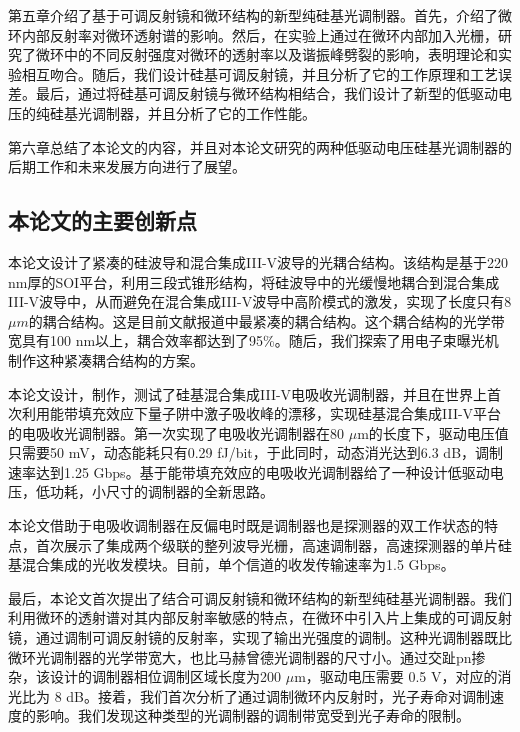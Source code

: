 第五章介绍了基于可调反射镜和微环结构的新型纯硅基光调制器。首先，介绍了微环内部反射率对微环透射谱的影响。然后，在实验上通过在微环内部加入光栅，研究了微环中的不同反射强度对微环的透射率以及谐振峰劈裂的影响，表明理论和实验相互吻合。随后，我们设计硅基可调反射镜，并且分析了它的工作原理和工艺误差。最后，通过将硅基可调反射镜与微环结构相结合，我们设计了新型的低驱动电压的纯硅基光调制器，并且分析了它的工作性能。

第六章总结了本论文的内容，并且对本论文研究的两种低驱动电压硅基光调制器的后期工作和未来发展方向进行了展望。

\subsection{本论文的主要创新点}
本论文设计了紧凑的硅波导和混合集成III-V波导的光耦合结构。该结构是基于220 nm厚的SOI平台，利用三段式锥形结构，将硅波导中的光缓慢地耦合到混合集成III-V波导中，从而避免在混合集成III-V波导中高阶模式的激发，实现了长度只有8 $\mu m$的耦合结构。这是目前文献报道中最紧凑的耦合结构。这个耦合结构的光学带宽具有100 nm以上，耦合效率都达到了95\%。随后，我们探索了用电子束曝光机制作这种紧凑耦合结构的方案。

本论文设计，制作，测试了硅基混合集成III-V电吸收光调制器，并且在世界上首次利用能带填充效应下量子阱中激子吸收峰的漂移，实现硅基混合集成III-V平台的电吸收光调制器。第一次实现了电吸收光调制器在80  $\mu$m的长度下，驱动电压值只需要50 mV，动态能耗只有0.29 fJ/bit，于此同时，动态消光达到6.3 dB，调制速率达到1.25 Gbps。基于能带填充效应的电吸收光调制器给了一种设计低驱动电压，低功耗，小尺寸的调制器的全新思路。

本论文借助于电吸收调制器在反偏电时既是调制器也是探测器的双工作状态的特点，首次展示了集成两个级联的整列波导光栅，高速调制器，高速探测器的单片硅基混合集成的光收发模块。目前，单个信道的收发传输速率为1.5 Gbps。 

最后，本论文首次提出了结合可调反射镜和微环结构的新型纯硅基光调制器。我们利用微环的透射谱对其内部反射率敏感的特点，在微环中引入片上集成的可调反射镜，通过调制可调反射镜的反射率，实现了输出光强度的调制。这种光调制器既比微环光调制器的光学带宽大，也比马赫曾德光调制器的尺寸小。通过交趾pn掺杂，该设计的调制器相位调制区域长度为200 $\mu$m，驱动电压需要 0.5 V，对应的消光比为 8 dB。接着，我们首次分析了通过调制微环内反射时，光子寿命对调制速度的影响。我们发现这种类型的光调制器的调制带宽受到光子寿命的限制。




